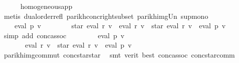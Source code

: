 \begin{isabellebody}
\ \ \ \ \isamarkupfalse%
\ homogeneous{\isacharunderscore}{\kern0pt}app\ \isamarkupfalse%
\ {\isacharparenleft}{\kern0pt}metis\ dual{\isacharunderscore}{\kern0pt}order{\isachardot}{\kern0pt}refl\ parikh{\isacharunderscore}{\kern0pt}conc{\isacharunderscore}{\kern0pt}right{\isacharunderscore}{\kern0pt}subset\ parikh{\isacharunderscore}{\kern0pt}img{\isacharunderscore}{\kern0pt}Un\ sup{\isachardot}{\kern0pt}mono{\isacharparenright}{\kern0pt}\isanewline
\ \ \isamarkupfalse%
\ \isamarkupfalse%
\ {\isachardoublequoteopen}{\isasymdots}\ {\isacharequal}{\kern0pt}\ {\isasymPsi}\ {\isacharparenleft}{\kern0pt}eval\ p\ v{\isacharparenright}{\kern0pt}\ {\isasymunion}\isanewline
\ \ \ \ \ \ {\isasymPsi}\ {\isacharparenleft}{\kern0pt}star\ {\isacharparenleft}{\kern0pt}eval\ {\isacharquery}{\kern0pt}r\ v{\isacharparenright}{\kern0pt}\ {\isacharat}{\kern0pt}{\isacharat}{\kern0pt}\ eval\ {\isacharquery}{\kern0pt}r\ v\ {\isacharat}{\kern0pt}{\isacharat}{\kern0pt}\ star\ {\isacharparenleft}{\kern0pt}eval\ {\isacharquery}{\kern0pt}r\ v{\isacharparenright}{\kern0pt}\ {\isacharat}{\kern0pt}{\isacharat}{\kern0pt}\ eval\ p\ v{\isacharparenright}{\kern0pt}{\isachardoublequoteclose}\isanewline
\ \ \ \ \isamarkupfalse%
\ {\isacharparenleft}{\kern0pt}simp\ add{\isacharcolon}{\kern0pt}\ conc{\isacharunderscore}{\kern0pt}assoc{\isacharparenright}{\kern0pt}\isanewline
\ \ \isamarkupfalse%
\ \isamarkupfalse%
\ {\isachardoublequoteopen}{\isasymdots}\ {\isacharequal}{\kern0pt}\ {\isasymPsi}\ {\isacharparenleft}{\kern0pt}eval\ p\ v{\isacharparenright}{\kern0pt}\ {\isasymunion}\isanewline
\ \ \ \ \ \ {\isasymPsi}\ {\isacharparenleft}{\kern0pt}eval\ {\isacharquery}{\kern0pt}r\ v\ {\isacharat}{\kern0pt}{\isacharat}{\kern0pt}\ star\ {\isacharparenleft}{\kern0pt}eval\ {\isacharquery}{\kern0pt}r\ v{\isacharparenright}{\kern0pt}\ {\isacharat}{\kern0pt}{\isacharat}{\kern0pt}\ eval\ p\ v{\isacharparenright}{\kern0pt}{\isachardoublequoteclose}\isanewline
\ \ \ \ \isamarkupfalse%
\ parikh{\isacharunderscore}{\kern0pt}img{\isacharunderscore}{\kern0pt}commut\ conc{\isacharunderscore}{\kern0pt}star{\isacharunderscore}{\kern0pt}star\ \isamarkupfalse%
\ {\isacharparenleft}{\kern0pt}smt\ {\isacharparenleft}{\kern0pt}verit{\isacharcomma}{\kern0pt}\ best{\isacharparenright}{\kern0pt}\ conc{\isacharunderscore}{\kern0pt}assoc\ conc{\isacharunderscore}{\kern0pt}star{\isacharunderscore}{\kern0pt}comm{\isacharparenright}{\kern0pt}\isanewline

\end{isabellebody}
